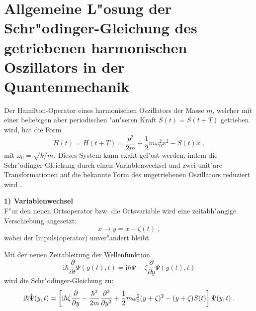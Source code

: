   \newpage



  \section{Allgemeine L"osung der Schr"odinger-Gleichung des getriebenen harmonischen Oszillators in der Quantenmechanik}
    Der Hamilton-Operator eines harmonischen Oszillators der Masse $m$, welcher mit einer beliebigen aber periodischen "au"seren Kraft $S(t)=S(t+T)$ getrieben wird, hat die Form
    \begin{equation}
      H(t) = H(t+T) = \frac{p^2}{2m} + \frac{1}{2}m\omega_0^2x^2-S(t)x \; ,
    \end{equation}
    mit $\omega_0=\sqrt{k/m}$.
    Dieses System kann exakt gel"ost werden, indem die Schr"odinger-Gleichung durch einen Variablenwechsel und zwei unit"are Transformationen auf die bekannte Form des ungetriebenen Oszillators reduziert wird \cite{haenggi}.

    \textbf{1) Variablenwechsel}\\
    F"ur den neuen Ortsoperator bzw. die Ortsvariable wird eine zeitabh"angige Verschiebung angesetzt:
    \begin{equation}
      x \rightarrow y=x-\zeta(t) \; ,
    \end{equation}
    wobei der Impuls(operator) unver"andert bleibt.

    Mit der neuen Zeitableitung der Wellenfunktion
    \begin{equation}
      \text{i}\hbar \frac{\partial}{\partial t} \Psi(y(t),t) = \text{i}\hbar \dot{\Psi} -\dot{\zeta}\frac{\partial}{\partial y}\Psi(y(t),t)
    \end{equation}
    wird die Schr"odinger-Gleichung zu:
    \begin{equation}
      \text i \hbar \dot{\Psi}(y,t) = \left[\text i \hbar \dot{\zeta}\frac{\partial}{\partial y}-\frac{\hbar^2}{2m}\frac{\partial^2}{\partial y^2}+\frac{1}{2}m\omega_0^2(y+\zeta)^2-(y+\zeta)S(t)\right]\Psi(y,t) \; .
      \label{schroedinger_einzeln_getrieben}
    \end{equation}

